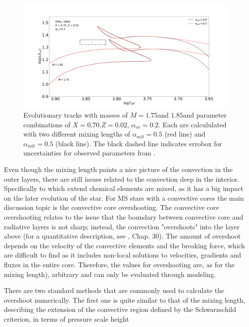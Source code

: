 \begin{figure}[htbp]
    \centering
    \includegraphics[width=1\textwidth]{mlt.png}
    \caption{Evolutionary tracks with masses of $M=1.75$\msun and $1.85$\msun and parameter combinations of $X=0.70$,$Z=0.02$, $\alpha_{ov}=0.2$. Each are calcululated with two different mixing lengths of $\alpha_{mlt}=0.5$ (red line) and $\alpha_{mlt}=0.5$ (black line). The black dashed line indicates errobox for uncertainties for observed parameters from \citet{lenz2010delta}.}
    \label{mlt}
\end{figure}

Even though the mixing length paints a nice picture of the convection in the outer layers, there are still issues related to the convection deep in the interior. Specifically to which extend chemical elements are mixed, as it has a big impact on the later evolution of the star. For MS stars with a convective cores the main discussion topic is the convective core overshooting. The convective core overshooting relates to the issue that the boundary between convective core and radiative layers is not sharp; instead, the convection "overshoots" into the layer above (for a quantitative description, see \citet{kippenhahn1990stellar}, Chap. 30). The amount of overshoot depends on the velocity of the convective elements and the breaking force, which are difficult to find as it includes non-local solutions to velocities, gradients and fluxes in the entire core. Therefore, the values for overshooting are, as for the mixing length), arbitrary and can only be evaluated through modeling. 

There are two standard methods that are commonly used to calculate the overshoot numerically. The first one is quite similar to that of the mixing length, describing the extension of the convective region defined by the Schwarzschild criterion, in terms of pressure scale height

